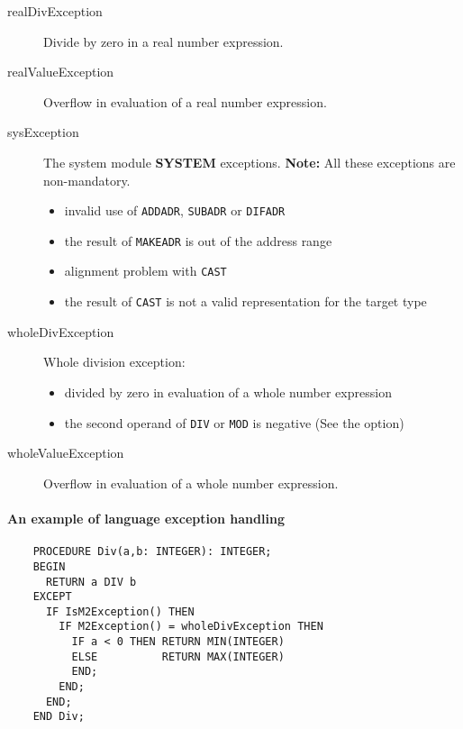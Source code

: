 \begin{description}
\item[realDivException] \mbox{}

        Divide by zero in a real number expression.

\item[realValueException] \mbox{}

        Overflow in evaluation of a real number expression.

\item[sysException] \mbox{}

        The system module {\bf SYSTEM} exceptions.
        {\bf Note:} All these exceptions are non-mandatory.
        \begin{itemize}
        \item invalid use of {\tt ADDADR}, {\tt SUBADR} or {\tt DIFADR}
        \item the result of {\tt MAKEADR} is out of the address range
        \item alignment problem with {\tt CAST}
        \item the result of {\tt CAST} is not a valid representation
              for the target type
        \end{itemize}

\item[wholeDivException] \mbox{}

        Whole division exception:
        \begin{itemize}
        \item divided by zero in evaluation of a whole number
              expression
        \item the second operand of \verb'DIV' or \verb'MOD' is negative
              (See the  option)
        \end{itemize}

\item[wholeValueException] \mbox{}

        Overflow in evaluation of a whole number expression.
\end{description}

\paragraph{An example of language exception handling}
\begin{verbatim}
    PROCEDURE Div(a,b: INTEGER): INTEGER;
    BEGIN
      RETURN a DIV b
    EXCEPT
      IF IsM2Exception() THEN
        IF M2Exception() = wholeDivException THEN
          IF a < 0 THEN RETURN MIN(INTEGER)
          ELSE          RETURN MAX(INTEGER)
          END;
        END;
      END;
    END Div;
\end{verbatim}

